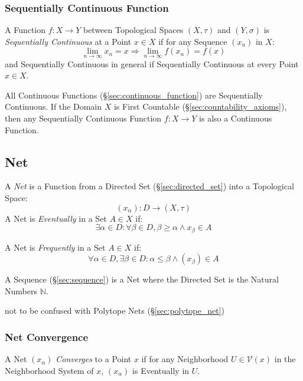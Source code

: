 \subsubsection{Sequentially Continuous Function}
\label{sec:sequentially_continuous}

A Function $f : X \rightarrow Y$ between Topological Spaces $(X,
\tau)$ and $(Y, \sigma)$ is \emph{Sequentially Continuous} at a Point
$x \in X$ if for any Sequence $(x_n)$ in $X$:
\[
  \lim_{n \rightarrow \infty} x_n = x
  \Rightarrow \lim_{n \rightarrow \infty} f(x_n) = f(x)
\]
and Sequentially Continuous in general if Sequentially Continuous at
every Point $x \in X$.

All Continuous Functions (\S\ref{sec:continuous_function}) are
Sequentially Continuous. If the Domain $X$ is First Countable
(\S\ref{sec:countability_axioms}), then any Sequentially Continuous
Function $f : X \rightarrow Y$ is also a Continuous Function.



\subsection{Net}\label{sec:net}

A \emph{Net} is a Function from a Directed Set (\S\ref{sec:directed_set}) into
a Topological Space:
\[
  (x_\alpha) : D \rightarrow (X, \tau)
\]
A Net is \emph{Eventually} in a Set $A \in X$ if:
\[
  \exists \alpha \in D
  : \forall \beta \in D, \beta \geq \alpha \wedge x_\beta \in A
\]

A Net is \emph{Frequently} in a Set $A \in X$ if:
\[
  \forall \alpha \in D, \exists \beta \in D
  : \alpha \leq \beta \wedge (x_\beta) \in A
\]

A Sequence (\S\ref{sec:sequence}) is a Net where the Directed Set is the
Natural Numbers $\mathbb{N}$.

\fist not to be confused with Polytope Nets (\S\ref{sec:polytope_net})



\subsubsection{Net Convergence}\label{sec:net_convergence}

A Net $(x_\alpha)$ \emph{Converges} to a Point $x$ if for any
Neighborhood $U \in \mathcal{V}(x)$ in the Neighborhood System of $x$,
$(x_\alpha)$ is Eventually in $U$.



